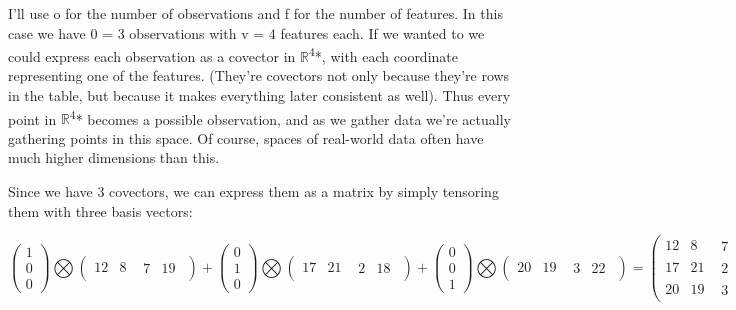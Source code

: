 \documentclass[oneside,english]{amsbook}
\numberwithin{section}{chapter}
\theoremstyle{plain}
\theoremstyle{definition}
\begin{document}
I'll use o for the number of observations and f for the number of
features. In this case we have 0 = 3 observations with v = 4 features
each. If we wanted to we could express each observation as a covector in
$\mathbb{R}$\textsuperscript{4}*, with each coordinate representing one of
the features. (They're covectors not only because they're rows in the
table, but because it makes everything later consistent as well). Thus
every point in $\mathbb{R}$\textsuperscript{4}* becomes a possible
observation, and as we gather data we're actually gathering points in
this space. Of course, spaces of real-world data often have much higher
dimensions than this.

Since we have 3 covectors, we can express them as a matrix by simply
tensoring them with three basis vectors:

\[\begin{pmatrix}
	1 \\
	0 \\
	0
\end{pmatrix}\bigotimes\begin{pmatrix}
	12 & 8 & \begin{matrix}
		7 & 19
	\end{matrix}
\end{pmatrix} + \begin{pmatrix}
	0 \\
	1 \\
	0
\end{pmatrix}\bigotimes\begin{pmatrix}
	17 & 21 & \begin{matrix}
		2 & 18
	\end{matrix}
\end{pmatrix} + \begin{pmatrix}
	0 \\
	0 \\
	1
\end{pmatrix}\bigotimes\begin{pmatrix}
	20 & 19 & \begin{matrix}
		3 & 22
	\end{matrix}
\end{pmatrix} = \begin{pmatrix}
	12 & 8 & \begin{matrix}
		7 & 19
	\end{matrix} \\
	17 & 21 & \begin{matrix}
		2 & 18
	\end{matrix} \\
	20 & 19 & \begin{matrix}
		3 & 22
	\end{matrix}
\end{pmatrix}\]
\end{document}
